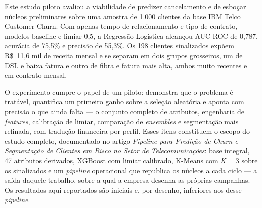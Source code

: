 \documentclass[12pt]{article}
\begin{document}
Este estudo piloto avaliou a viabilidade de predizer cancelamento e de
esboçar núcleos preliminares sobre uma amostra de 1.000 clientes da base IBM
Telco Customer Churn. Com apenas tempo de relacionamento e tipo de
contrato, modelos baseline e limiar 0,5, a Regressão Logística alcançou
AUC-ROC de 0,787, acurácia de 75,5\% e precisão de 55,3\%. Os 198 clientes
sinalizados expõem R\$~11,6 mil de receita mensal e se separam em dois
grupos grosseiros, um de DSL e baixa fatura e outro de fibra e fatura mais
alta, ambos muito recentes e em contrato mensal.

O experimento cumpre o papel de um piloto: demonstra que o problema é
tratável, quantifica um primeiro ganho sobre a seleção aleatória e aponta
com precisão o que ainda falta --- o conjunto completo de atributos,
engenharia de \textit{features}, calibração de limiar, comparação de
\textit{ensembles} e segmentação mais refinada, com tradução financeira por
perfil. Esses itens constituem o escopo do estudo completo, documentado no
artigo \textit{Pipeline para Predição de Churn e Segmentação de Clientes em
Risco no Setor de Telecomunicações}: base integral, 47 atributos derivados,
XGBoost com limiar calibrado, K-Means com $K = 3$ sobre os sinalizados e um
\textit{pipeline} operacional que republica os núcleos a cada ciclo --- a
saída daquele trabalho, sobre a qual a empresa desenha as próprias
campanhas. Os resultados aqui reportados são iniciais e, por desenho,
inferiores aos desse \textit{pipeline}.



\end{document}
